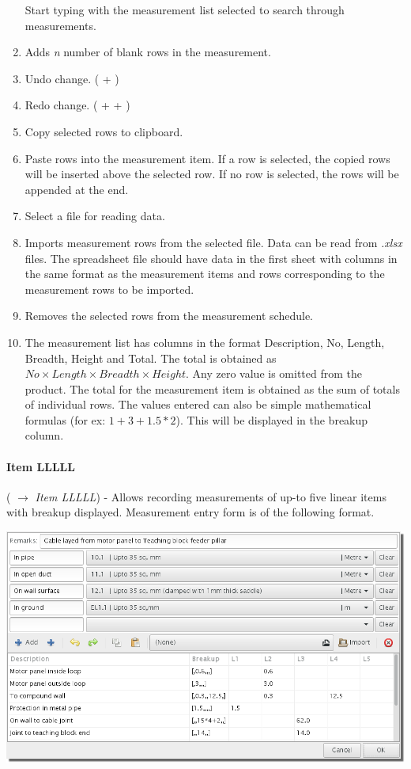 \documentclass[twoside,a4paper]{refart}
\newenvironment{noteblock}[1]%
{\begin{mdframed}[topline=false,bottomline=false, rightline=false,
		linewidth=2pt, frametitle={#1}]}%
		{\end{mdframed}}
\begin{document}
\begin{enumerate}
\begin{noteblock}{Tips!}
		 		Start typing with the measurement list selected to search through measurements.
	 	\end{noteblock}
	 	\item Adds \emph{n} number of blank rows in the measurement.
	 	\item Undo change. ( + )
	 	\item Redo change. ( +  + )	 
	 	\item Copy selected rows to clipboard.
	 	\item Paste rows into the measurement item. If a row is selected, the copied rows will be inserted above the selected row. If no row is selected, the rows will be appended at the end.
	 	\item Select a file for reading data.
	 	\item Imports measurement rows from the selected file. Data can be read from \emph{.xlsx} files. The spreadsheet file should have data in the first sheet with columns in the same format as the measurement items and rows corresponding to the measurement rows to be imported.\\
	 	\item Removes the selected rows from the measurement schedule.
	 	\item The measurement list has columns in the format Description, No, Length, Breadth, Height and Total. The total is obtained as $No \times Length \times Breadth \times Height$. Any zero value is omitted from the product. The total for the measurement item is obtained as the sum of totals of individual rows. The values entered can also be simple mathematical formulas (for ex: $1+3+1.5*2$). This will be displayed in the breakup column.
	 \end{enumerate}
	 
	 \paragraph{Item LLLLL} (\fbox{\emph{$+$}} $\rightarrow$ \emph{Item LLLLL}) - Allows recording measurements of up-to five linear items with breakup displayed. Measurement entry form is of the following format.
	 
	 \begin{maxipage}
	 	\includegraphics[width=1\linewidth]{screenshots/window_lllll.png}
	 \end{maxipage}
	 
\end{document}

